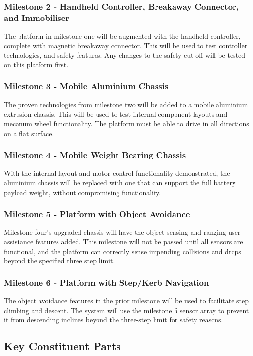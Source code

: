 \documentclass [12pt]{article}
\begin{document}
\subsubsection{Milestone 2 - Handheld Controller, Breakaway Connector, and Immobiliser}
The platform in milestone one will be augmented with the handheld controller, complete with magnetic breakaway connector. This will be used to test controller technologies, and safety features. Any changes to the safety cut-off will be tested on this platform first.

\subsubsection{Milestone 3 - Mobile Aluminium Chassis}
The proven technologies from milestone two will be added to a mobile aluminium extrusion chassis. This will be used to test internal component layouts and mecanum wheel functionality. The platform must be able to drive in all directions on a flat surface.

\subsubsection{Milestone 4 - Mobile Weight Bearing Chassis}
With the internal layout and motor control functionality demonstrated, the aluminium chassis will be replaced with one that can support the full battery payload weight, without compromising functionality.

\subsubsection{Milestone 5 - Platform with Object Avoidance}
Milestone four’s upgraded chassis will have the object sensing and ranging user assistance features added. This milestone will not be passed until all sensors are functional, and the platform can correctly sense impending collisions and drops beyond the specified three step limit.

\subsubsection{Milestone 6 - Platform with Step/Kerb Navigation}
The object avoidance features in the prior milestone will be used to facilitate step climbing and descent. The system will use the milestone 5 sensor array to prevent it from descending inclines beyond the three-step limit for safety reasons.

\subsection{Key Constituent Parts}\label{sec:key_constituent_parts}
\end{document}
